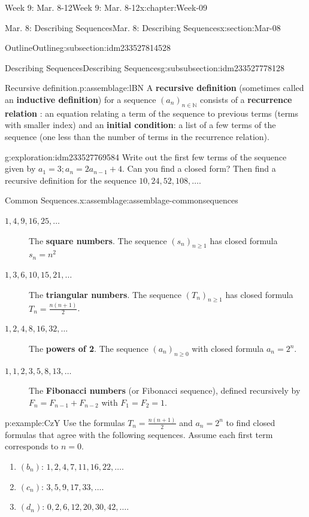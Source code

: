 \documentclass[oneside,10pt,]{book}
\newcommand{\terminology}[1]{\textbf{#1}}
\numberwithin{equation}{section}
\renewcommand{\ge}{\geqslant}
\def\N{{\mathbb N}}
\newcommand{\N}{\mathbb N}
\begin{document}
\begin{chapterptx}{Week 9: Mar. 8-12}{}{Week 9: Mar. 8-12}{}{}{x:chapter:Week-09}
\begin{sectionptx}{Mar. 8: Describing Sequences}{}{Mar. 8: Describing Sequences}{}{}{x:section:Mar-08}
\begin{subsectionptx}{Outline}{}{Outline}{}{}{g:subsection:idm233527814528}
\begin{subsubsectionptx}{Describing Sequences}{}{Describing Sequences}{}{}{g:subsubsection:idm233527778128}
\begin{assemblage}{Recursive definition.}{p:assemblage:lBN}
A \terminology{recursive definition}  (sometimes called an \terminology{inductive definition}) for a sequence \((a_n)_{n\in\N}\) consists of a \terminology{recurrence relation}  : an equation relating a term of the sequence to previous terms (terms with smaller index) and an \terminology{initial condition}:  a list of a few terms of the sequence (one less than the number of terms in the recurrence relation).%
\end{assemblage}
\begin{exploration}{}{g:exploration:idm233527769584}%
Write out the first few terms of the sequence given by \(a_1 = 3; a_n = 2 a_{n-1}+4\). Can you find a closed form? Then find a recursive definition for the sequence \(10, 24, 52, 108, \ldots\).%
\end{exploration}%
\begin{assemblage}{Common Sequences.}{x:assemblage:assemblage-commonsequences}%
%
\begin{description}
\item[{\(1, 4, 9, 16, 25, \ldots\)}]The \terminology{square numbers}.  The sequence \((s_n)_{n \ge 1}\) has closed formula \(s_n = n^2\)%
\item[{\(1, 3, 6, 10, 15, 21, \ldots\)}]The \terminology{triangular numbers}.  The sequence \((T_n)_{n \ge 1}\) has closed formula \(T_n = \frac{n(n+1)}{2}\).%
\label{g:notation:idm233527751456}\item[{\(1, 2, 4, 8, 16, 32,\ldots\)}]The \terminology{powers of 2}.  The sequence \((a_n)_{n \ge 0}\) with closed formula \(a_n = 2^n\).%
\item[{\(1, 1, 2, 3, 5, 8, 13, \ldots\)}]The \terminology{Fibonacci numbers} (or Fibonacci sequence), defined recursively by \(F_n = F_{n-1} + F_{n-2}\) with \(F_1 = F_2 = 1\).%
\end{description}
%
\end{assemblage}
\begin{example}{}{p:example:CzY}%
Use the formulas \(T_n = \frac{n(n+1)}{2}\) and \(a_n = 2^n\) to find closed formulas that agree with the following sequences.  Assume each first term corresponds to \(n=0\).%
\begin{enumerate}
\item{}\((b_n)\): \(1, 2, 4, 7, 11, 16, 22, \ldots \).%
\item{}\((c_n)\): \(3, 5, 9, 17, 33,\ldots \).%
\item{}\((d_n)\): \(0, 2, 6, 12, 20, 30, 42,\ldots \).%

\end{enumerate}
\end{example}
\end{subsubsectionptx}
\end{subsectionptx}
\end{sectionptx}
\end{chapterptx}
\end{document}
